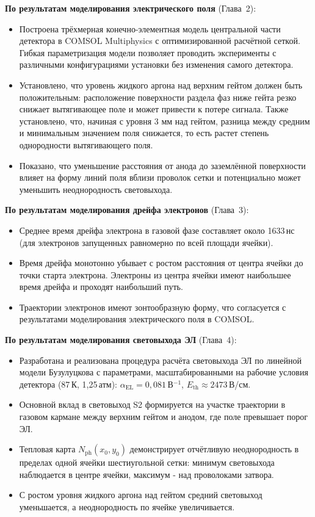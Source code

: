 \documentclass[12pt]{article}
\begin{document}
\textbf{По результатам моделирования электрического поля} (Глава~2):
\begin{itemize}
  \item Построена трёхмерная конечно-элементная модель центральной части
        детектора в COMSOL Multiphysics с оптимизированной расчётной сеткой.
        Гибкая параметризация модели позволяет проводить эксперименты с
        различными конфигурациями установки без изменения самого детектора.
  \item Установлено, что уровень жидкого аргона над верхним гейтом должен
        быть положительным: расположение поверхности раздела фаз ниже
        гейта резко снижает вытягивающее поле и может привести к потере
        сигнала. Также установлено, что, начиная с уровня 3 мм над гейтом, разница между средним и минимальным значением поля снижается, то есть растет степень однородности вытягивающего поля. 
  \item Показано, что уменьшение расстояния от анода до заземлённой
        поверхности влияет на форму линий поля вблизи проволок сетки и
        потенциально может уменьшить неоднородность световыхода.
\end{itemize}

\textbf{По результатам моделирования дрейфа электронов} (Глава~3):
\begin{itemize}
  \item Среднее время дрейфа электрона в газовой фазе составляет около
        1633\,нс (для электронов запущенных равномерно по всей площади ячейки).
  \item Время дрейфа монотонно убывает с ростом расстояния от центра
        ячейки до точки старта электрона. Электроны из центра ячейки
        имеют наибольшее время дрейфа и проходят наибольший путь.
  \item Траектории электронов имеют зонтообразную форму, что согласуется
        с результатами моделирования электрического поля в COMSOL.
\end{itemize}

\textbf{По результатам моделирования световыхода ЭЛ} (Глава~4):
\begin{itemize}
  \item Разработана и реализована процедура расчёта световыхода ЭЛ по
        линейной модели Бузулуцкова с параметрами, масштабированными на
        рабочие условия детектора (87\,К, 1{,}25\,атм):
        $\alpha_\text{EL} = 0{,}081$\,В$^{-1}$,
        $E_\text{th} \approx 2473$\,В/см.
  \item Основной вклад в световыход S2 формируется на участке траектории
        в газовом кармане между верхним гейтом и анодом, где поле
        превышает порог ЭЛ.
  \item Тепловая карта $N_\text{ph}(x_0, y_0)$ демонстрирует отчётливую
        неоднородность в пределах одной ячейки шестиугольной сетки:
        минимум световыхода наблюдается в центре ячейки, максимум -
        над проволоками затвора.
  \item С ростом уровня жидкого аргона над гейтом средний световыход
        уменьшается, а неоднородность по ячейке увеличивается.
\end{itemize}
\end{document}
